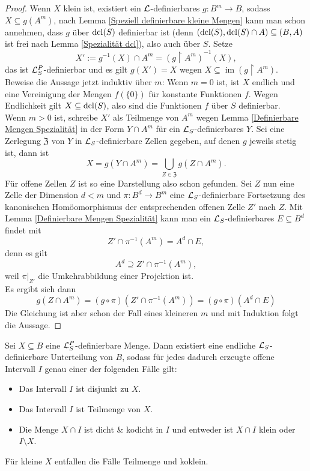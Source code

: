 \begin{proof}
	Wenn $X$ klein ist, existiert ein $\mathcal{L}$-definierbares $g:B^m\rightarrow B$, sodass $X\subseteq g(A^m)$, nach Lemma \ref{Speziell definierbare kleine Mengen} kann man schon annehmen, dass $g$ über $\operatorname{dcl}(S)$ definierbar ist (denn $(\operatorname{dcl}(S),\operatorname{dcl}(S)\cap A)\subseteq (B,A)$ ist frei nach Lemma \ref{Spezialität dcl}), also auch über $S$. Setze $$X':=g^{-1}(X)\cap A^m=(g\upharpoonright A^m)^{-1}(X),$$ das ist $\mathcal{L}^P_S$-definierbar und es gilt $g(X')=X$ wegen $X\subseteq\operatorname{im}(g\upharpoonright A^m)$.\\
	Beweise die Aussage jetzt induktiv über $m$: Wenn $m=0$ ist, ist $X$ endlich und eine Vereinigung der Mengen $f(\{0\})$ für konstante Funktionen $f$. Wegen Endlichkeit gilt $X\subseteq\operatorname{dcl}(S)$, also sind die Funktionen $f$ über $S$ definierbar.\\
	Wenn $m>0$ ist, schreibe $X'$ als Teilmenge von $A^m$ wegen Lemma \ref{Definierbare Mengen Spezialität} in der Form $Y\cap A^m$ für ein $\mathcal{L}_S$-definierbares $Y$. Sei eine Zerlegung $\mathfrak{Z}$ von $Y$ in $\mathcal{L}_S$-definierbare Zellen gegeben, auf denen $g$ jeweils stetig ist, dann ist $$X=g(Y\cap A^m)=\bigcup\limits_{Z\in\mathfrak{Z}}g(Z\cap A^m).$$
	Für offene Zellen $Z$ ist so eine Darstellung also schon gefunden. Sei $Z$ nun eine Zelle der Dimension $d<m$ und $\pi:B^d\rightarrow B^m$ eine $\mathcal{L}_S$-definierbare Fortsetzung des kanonischen Homöomorphismus der entsprechenden offenen Zelle $Z'$ nach $Z$. Mit Lemma \ref{Definierbare Mengen Spezialität} kann man ein $\mathcal{L}_S$-definierbares $E\subseteq B^d$ findet mit $$Z'\cap\pi^{-1}(A^m)=A^d\cap E,$$ denn es gilt $$A^d\supseteq Z'\cap\pi^{-1}(A^m),$$ weil $\pi|_{Z'}$ die Umkehrabbildung einer Projektion ist.\\
	Es ergibt sich dann
	$$g(Z\cap A^m)=(g\circ\pi)(Z'\cap\pi^{-1}(A^m))=(g\circ\pi)(A^d\cap E)$$
	Die Gleichung ist aber schon der Fall eines kleineren $m$ und mit Induktion folgt die Aussage.
\end{proof}
\newpage
\begin{theorem}\label{Satz 4}
	Sei $X\subseteq B$ eine $\mathcal{L}^P_S$-definierbare Menge. Dann existiert eine endliche $\mathcal{L}_S$-definierbare Unterteilung von $B$, sodass für jedes dadurch erzeugte offene Intervall $I$ genau einer der folgenden Fälle gilt:
	\begin{itemize}
		\item Das Intervall $I$ ist disjunkt zu $X$.
		\item Das Intervall $I$ ist Teilmenge von $X$.
		\item Die Menge $X\cap I$ ist dicht \& kodicht in $I$ und entweder ist $X\cap I$ klein oder $I\setminus X$.
	\end{itemize}
	Für kleine $X$ entfallen die Fälle \glqq{}Teilmenge\grqq{} und \glqq{}koklein\grqq{}.
\end{theorem}
